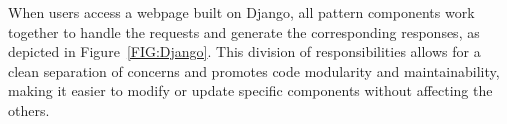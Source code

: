 When users access a webpage built on Django, all pattern components work together to handle the requests and generate the corresponding responses, as depicted in Figure~\ref{FIG:Django}. This division of responsibilities allows for a clean separation of concerns and promotes code modularity and maintainability, making it easier to modify or update specific components without affecting the others.